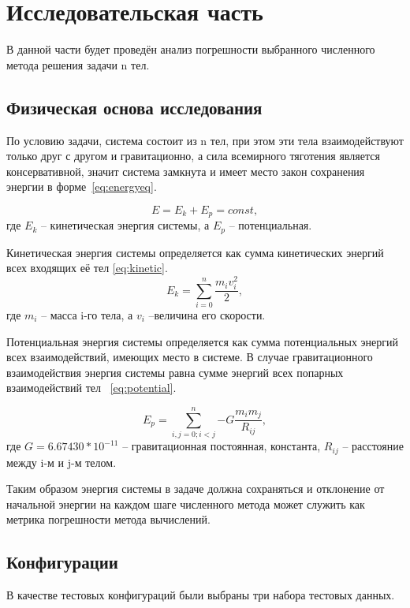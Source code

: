 \chapter{Исследовательская часть}

В данной части будет проведён анализ погрешности выбранного численного метода решения задачи n тел.

\section{Физическая основа исследования}

По условию задачи, система состоит из n тел, при этом эти тела взаимодействуют только друг с другом и гравитационно, а сила всемирного тяготения является консервативной, значит система замкнута и имеет место закон сохранения энергии в форме~\ref{eq:energyeq}\cite{fn4}.

\begin{equation}
	\label{eq:energyeq}
	E = E_k + E_p = const,
\end{equation}
где $E_k$ -- кинетическая энергия системы, а $E_p$ -- потенциальная.

Кинетическая энергия системы определяется как сумма кинетических энергий всех входящих её тел \ref{eq:kinetic}.
\begin{equation}
	\label{eq:kinetic}
	E_k = \sum_{i=0}^n{\frac{m_iv_i^2}{2}},
\end{equation}
где $m_i$ -- масса i-го тела, а $v_i$ --величина его скорости.

Потенциальная энергия системы определяется как сумма потенциальных энергий всех взаимодействий, имеющих место в системе. В случае гравитационного взаимодействия энергия системы равна сумме энергий всех попарных взаимодействий тел ~\ref{eq:potential}\cite{fn4}.


\begin{equation}
	\label{eq:potential}
	E_p = \sum_{i,j=0; i < j}^n{-G\frac{m_im_j}{R_{ij}}},
\end{equation}
где $G = 6.67430 * 10^{-11}$ -- гравитационная постоянная, константа, $R_{ij}$ -- расстояние между i-м и j-м телом.

Таким образом энергия системы в задаче должна сохраняться и отклонение от начальной энергии на каждом шаге численного метода может служить как метрика погрешности метода вычислений.

\section{Конфигурации}
В качестве тестовых конфигураций были выбраны три набора тестовых данных.

